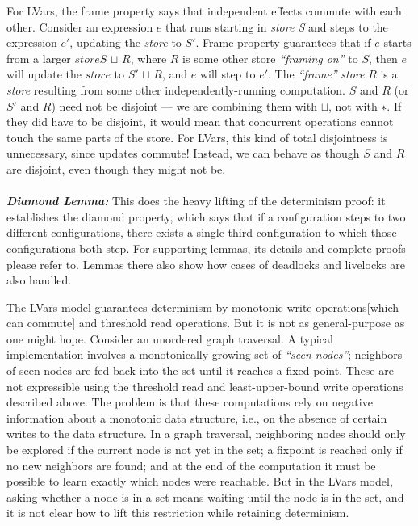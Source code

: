 \documentclass[twocolumn]{article}
\begin{document}
For LVars, the frame property says that independent effects commute with each other. Consider an expression $e$ that runs starting in \emph{store S} and steps to the expression $e′$, updating the \emph{store} to $S′$. Frame property guarantees that if $e$ starts from a larger $store S$ $\sqcup$ $R$, where $R$ is some other store \emph{“framing on”} to $S$, then $e$  will update the $store$ to $S′$ $\sqcup$ $R$, and $e$ will step to $e′$. The \emph{“frame”} \emph{store} $R$  is a \emph{store} resulting from some other independently-running computation. $S$ and $R$ (or $S′$ and $R$) need not be disjoint — we are combining them with $\sqcup$, not with $∗$. If they did have to be disjoint, it would mean that concurrent operations cannot touch the same parts of the store. For LVars, this kind of total disjointness is unnecessary, since updates commute! Instead, we can behave as though $S$ and $R$ are disjoint, even though they might not be. \\ \\
\textbf{\textit{Diamond Lemma:}} This does the heavy lifting of the determinism proof: it establishes the diamond property, which says that if a configuration steps to two different configurations, there exists a single third configuration to which those configurations both step. For supporting lemmas, its details and complete proofs please refer to\cite{lkuper}. Lemmas there also show how cases of deadlocks and livelocks are also handled.

The LVars model guarantees determinism by monotonic write operations[which can commute] and threshold read operations. But it is not as general-purpose as one might hope. Consider an unordered graph traversal. A typical implementation involves a monotonically growing set of \emph{“seen nodes”}; neighbors of seen nodes are fed back into the set until it reaches a fixed point. These are not expressible using the threshold read and least-upper-bound write operations described above. The problem is that these computations rely on negative information about a monotonic data structure, i.e., on the absence of certain writes to the data structure. In a graph traversal, neighboring nodes should only be explored if the current node is not yet in the set; a fixpoint is reached only if no new neighbors are found; and at the end of the computation it must be possible to learn exactly which nodes were reachable. But in the LVars model, asking whether a node is in a set means waiting until the node is in the set, and it is not clear how to lift this restriction while retaining determinism.
\end{document}
